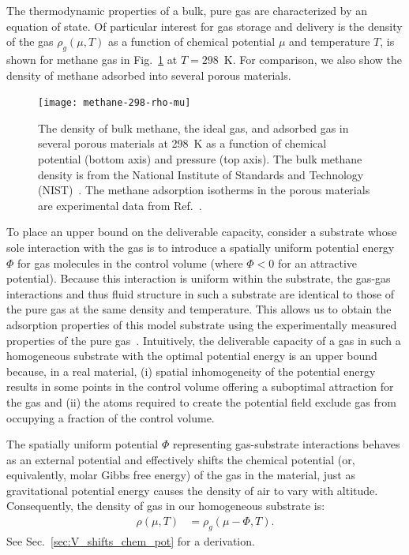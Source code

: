 \documentclass[twoside,twocolumn,9pt]{article}
\newcommand\V{\Phi}
\begin{document}
The thermodynamic properties of a bulk, pure gas are characterized by an
equation of state. Of particular interest for gas storage and delivery is the
density of the gas $\rho_g(\mu,T)$ as a function of chemical potential $\mu$
and temperature $T$, is shown for methane gas in
Fig.~\ref{fig:density-vs-mu-ch4} at $T=298$\ K. For comparison, we also show
the density of methane adsorbed into several porous materials.

\begin{figure}
    \centering
    \texttt{[image: methane-298-rho-mu]}
    \caption{The density of bulk methane, the ideal gas, and adsorbed gas in several porous materials at 298\ K as a function of chemical potential (bottom axis) and pressure (top axis). The bulk methane density is from the National Institute of Standards and Technology (NIST)~\cite{nist}. The methane adsorption isotherms in the porous materials are experimental data from Ref.~\cite{mason2014evaluating, furukawa2009storage}.
    }
    \label{fig:density-vs-mu-ch4}
  \end{figure}
  
  To place an upper bound on the deliverable capacity, consider a substrate whose
sole interaction with the gas is to introduce a spatially uniform potential
energy $\V$ for gas molecules in the control volume (where $\V<0$ for an
attractive potential). Because this interaction is uniform within the
substrate, the gas-gas interactions and thus fluid structure in such a
substrate are identical to those of the pure gas at the same density and
temperature. This allows us to obtain the adsorption properties of this model
substrate using the experimentally measured properties of the pure
gas~\cite{nist}. Intuitively, the deliverable capacity of a gas in such a
homogeneous substrate with the optimal potential energy is an upper bound
because, in a real material, (i) spatial inhomogeneity of the potential
energy results in some points in the control volume offering a suboptimal
attraction for the gas and (ii) the atoms required to create the potential
field exclude gas from occupying a fraction of the control volume.

The spatially uniform potential $\V$ representing gas-substrate interactions
behaves as an external potential and effectively shifts the chemical potential
(or, equivalently, molar Gibbs free energy) of the gas in the material, just as
gravitational potential energy causes the density of air to vary with altitude.
Consequently, the density of gas in our homogeneous substrate is:
\begin{align}
    \rho(\mu,T) &= \rho_g(\mu - \V,T). \label{eq:mof-density}
\end{align}
See Sec.~\ref{sec:V_shifts_chem_pot} for a derivation.
\end{document}
